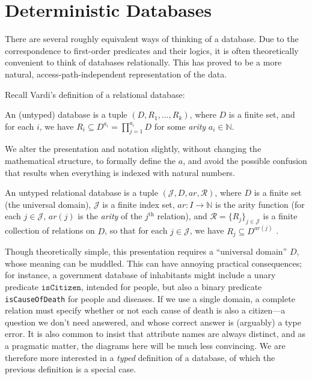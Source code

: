 \documentclass{article}
\theoremstyle{plain}
\theoremstyle{definition}
\theoremstyle{remark}
\newcommand{\Idx}{\mathcal J}
\newcommand{\arity}{\mathit{ar}}
\begin{document}

\section{Deterministic Databases}

There are several roughly equivalent ways of thinking of a database. Due to the correspondence to first-order predicates and their logics, it is often theoretically convenient to think of databases relationally. This has proved \cite{Codd} to be a more natural, access-path-independent representation of the data.   

Recall Vardi's \cite{vardi} definition of a relational database:
\begin{leftbar}	
\begin{defn*}
    An (untyped) database is a tuple $(D, R_1, \ldots, R_k)$, where $D$ is a finite set, and for each $i$, we have $R_i \subseteq D^{a_i} = \prod_{j =1}^{a_i} D$ 
    for some \emph{arity} $a_i \in \mathbb N$. 
\end{defn*}
\end{leftbar}

We alter the presentation and notation slightly, without changing the mathematical structure, to formally define the $a$, and avoid the possible confusion that results when everything is indexed with natural numbers. 

\begin{defn}
    An untyped relational database is a tuple $(\Idx, D, \arity, \mathcal R)$, where $D$ is a
    finite set (the universal domain), $\Idx$ is a finite index set, $\arity: I \to
    \mathbb N$ is the arity function (for each $j \in \Idx$, $\arity(j)$ is the
    \emph{arity} of the $j^{\text{th}}$ relation), and $\mathcal R = \{R_j\}_{j
    \in \Idx}$ is a finite collection of relations on $D$, so that for each $j \in
    \Idx$, we have $R_j \subseteq D^{\arity(j)} $%
    .
\end{defn}

Though theoretically simple, this presentation requires a  ``universal domain'' $D$, whose meaning can be muddled. This can have annoying practical consequences; for instance, a government database of inhabitants might include a unary predicate $\texttt{isCitizen}$, intended for people, but also a binary predicate \texttt{isCauseOfDeath} for people and diseases. If we use a single domain, a complete relation must specify whether or not each cause of death is also a citizen---a question we don't need answered, and whose correct answer is (arguably) a type error.
It is also common to insist that attribute names are always distinct, and as a pragmatic matter, the diagrams here will be much less convincing. 
%
We are therefore more interested in a \emph{typed} definition of a database, of which the previous definition is a special case.
\end{document}
